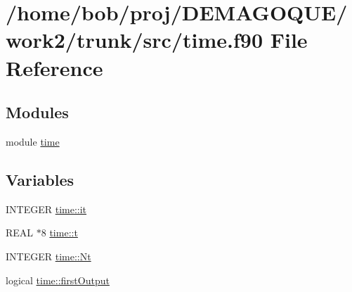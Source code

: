 \hypertarget{time_8f90}{
\section{/home/bob/proj/DEMAGOQUE/work2/trunk/src/time.f90 File Reference}
\label{time_8f90}
}
\subsection*{Modules}
\begin{DoxyCompactItemize}
\item 
module \hyperlink{namespacetime}{time}
\end{DoxyCompactItemize}
\subsection*{Variables}
\begin{DoxyCompactItemize}
\item 
INTEGER \hyperlink{namespacetime_a1c2033688a38409cbcaad410e84a8112}{time::it}
\item 
REAL $\ast$8 \hyperlink{namespacetime_aa46f2c3f534f88596e49840033d82a8a}{time::t}
\item 
INTEGER \hyperlink{namespacetime_a4c36d14fae709416558ca0d915019452}{time::Nt}
\item 
logical \hyperlink{namespacetime_a85d38f2317f7267d268d28eabe5c1e06}{time::firstOutput}
\end{DoxyCompactItemize}
